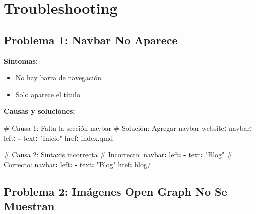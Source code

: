 \documentclass[
  doc,
  floatsintext,
  longtable,
  a4paper,
  nolmodern,
  notxfonts,
  notimes,
  12pt,
  colorlinks=true,linkcolor=blue,citecolor=blue,urlcolor=blue]{apa7}
\newenvironment{Shaded}{\begin{snugshade}}{\end{snugshade}}
\newcommand{\AttributeTok}[1]{\textcolor[rgb]{0.40,0.45,0.13}{#1}}
\newcommand{\CommentTok}[1]{\textcolor[rgb]{0.37,0.37,0.37}{#1}}
\newcommand{\FunctionTok}[1]{\textcolor[rgb]{0.28,0.35,0.67}{#1}}
\newcommand{\KeywordTok}[1]{\textcolor[rgb]{0.00,0.23,0.31}{\textbf{#1}}}
\newcommand{\StringTok}[1]{\textcolor[rgb]{0.13,0.47,0.30}{#1}}
\providecommand{\tightlist}{%
  \setlength{\itemsep}{0pt}\setlength{\parskip}{0pt}}
\begin{document}
\section{Troubleshooting}\label{troubleshooting}

\subsection{Problema 1: Navbar No
Aparece}\label{problema-1-navbar-no-aparece}

\textbf{Síntomas:}

\begin{itemize}
\tightlist
\item
  No hay barra de navegación
\item
  Solo aparece el título
\end{itemize}

\textbf{Causas y soluciones:}

\begin{Shaded}
\begin{Highlighting}[]
\CommentTok{\# Causa 1: Falta la sección navbar}
\CommentTok{\# Solución: Agregar navbar}
\FunctionTok{website}\KeywordTok{:}
\AttributeTok{  }\FunctionTok{navbar}\KeywordTok{:}
\AttributeTok{    }\FunctionTok{left}\KeywordTok{:}
\AttributeTok{      }\KeywordTok{{-}}\AttributeTok{ }\FunctionTok{text}\KeywordTok{:}\AttributeTok{ }\StringTok{"Inicio"}
\AttributeTok{        }\FunctionTok{href}\KeywordTok{:}\AttributeTok{ index.qmd}

\CommentTok{\# Causa 2: Sintaxis incorrecta}
\CommentTok{\# Incorrecto:}
\FunctionTok{navbar}\KeywordTok{:}
\FunctionTok{left}\KeywordTok{:}
\AttributeTok{  }\KeywordTok{{-}}\AttributeTok{ }\FunctionTok{text}\KeywordTok{:}\AttributeTok{ }\StringTok{"Blog"}
\AttributeTok{  }
\CommentTok{\# Correcto:}
\FunctionTok{navbar}\KeywordTok{:}
\AttributeTok{  }\FunctionTok{left}\KeywordTok{:}
\AttributeTok{    }\KeywordTok{{-}}\AttributeTok{ }\FunctionTok{text}\KeywordTok{:}\AttributeTok{ }\StringTok{"Blog"}
\AttributeTok{      }\FunctionTok{href}\KeywordTok{:}\AttributeTok{ blog/}
\end{Highlighting}
\end{Shaded}

\subsection{Problema 2: Imágenes Open Graph No Se
Muestran}\label{problema-2-imuxe1genes-open-graph-no-se-muestran}
\end{document}
